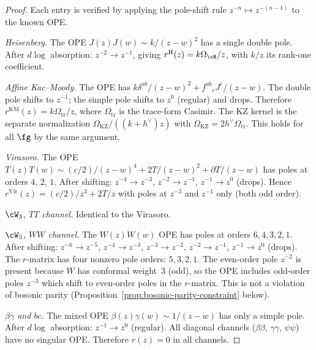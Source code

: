 \begin{proof}
Each entry is verified by applying the pole-shift rule
$z^{-n} \mapsto z^{-(n-1)}$ to the known OPE.

\emph{Heisenberg.}
The OPE $J(z)J(w) \sim k/(z{-}w)^2$ has a single double pole.
After $d\log$ absorption: $z^{-2} \to z^{-1}$, giving
$r^{\mathrm{H}}(z) = k\Omega_{\cH}/z$, with $k/z$ its rank-one
coefficient.

\emph{Affine Kac--Moody.}
The OPE has $k\delta^{ab}/(z{-}w)^2 + f^{ab}{}_{c}J^c/(z{-}w)$.
The double pole shifts to $z^{-1}$; the simple pole shifts to
$z^0$ (regular) and drops. Therefore
$r^{\mathrm{KM}}(z)=k\Omega_{\mathrm{tr}}/z$, where
$\Omega_{\mathrm{tr}}$ is the trace-form Casimir. The KZ kernel is
the separate normalization
$\Omega_{\mathrm{KZ}}/((k+h^\vee)z)$ with
$\Omega_{\mathrm{KZ}}=2h^\vee\Omega_{\mathrm{tr}}$.
This holds for all $\fg$ by the same argument.

\emph{Virasoro.}
The OPE $T(z)T(w) \sim (c/2)/(z{-}w)^4 + 2T/(z{-}w)^2
+ \partial T/(z{-}w)$ has poles at orders $4$, $2$, $1$.
After shifting: $z^{-4} \to z^{-3}$, $z^{-2} \to z^{-1}$,
$z^{-1} \to z^0$ (drops). Hence
$r^{\mathrm{Vir}}(z) = (c/2)/z^3 + 2T/z$
with poles at $z^{-3}$ and $z^{-1}$ only (both odd order).

\emph{$\cW_3$, $TT$ channel.}
Identical to the Virasoro.

\emph{$\cW_3$, $WW$ channel.}
The $W(z)W(w)$ OPE has poles at orders $6, 4, 3, 2, 1$.
After shifting: $z^{-6} \to z^{-5}$, $z^{-4} \to z^{-3}$,
$z^{-3} \to z^{-2}$, $z^{-2} \to z^{-1}$,
$z^{-1} \to z^0$ (drops).
The $r$-matrix has four nonzero pole orders: $5, 3, 2, 1$.
The even-order pole $z^{-2}$ is present because $W$ has
conformal weight~$3$ (odd), so the OPE includes odd-order poles
$z^{-3}$ which shift to even-order poles in the $r$-matrix.
This is not a violation of bosonic parity
(Proposition~\ref{prop:bosonic-parity-constraint} below).

\emph{$\beta\gamma$ and $bc$.}
The mixed OPE $\beta(z)\gamma(w) \sim 1/(z{-}w)$ has only a simple pole.
After $d\log$ absorption: $z^{-1} \to z^0$ (regular).
All diagonal channels ($\beta\beta$, $\gamma\gamma$, $\psi\psi$)
have no singular OPE. Therefore $r(z) = 0$ in all channels.
\end{proof}

